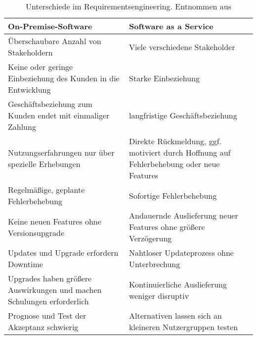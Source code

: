 \begin{table}[ht!]
\centering
\begin{longtable}{|p{}|p{}|}
\hline
\textbf{On-Premise-Software} & \textbf{Software as a Service} \\
\hline %
Überschaubare Anzahl von Stakeholdern & Viele verschiedene Stakeholder \\
\hline
Keine oder geringe Einbeziehung des Kunden in die Entwicklung & Starke 
Einbeziehung \\ \hline
Geschäftsbeziehung zum Kunden endet mit einmaliger Zahlung & langfristige 
Geschäftsbeziehung \\ \hline
Nutzungserfahrungen nur über spezielle Erhebungen & Direkte Rückmeldung, ggf. 
motiviert durch Hoffnung auf Fehlerbehebung oder neue Features \\ \hline
Regelmäßige, geplante Fehlerbehebung & Sofortige Fehlerbehebung \\ \hline
Keine neuen Features ohne Versionsupgrade & Andauernde Auslieferung neuer 
Features ohne größere Verzögerung \\ \hline
Updates und Upgrade erfordern Downtime & Nahtloser Updateprozess ohne 
Unterbrechung \\ \hline
Upgrades haben größere Auswirkungen und machen Schulungen erforderlich & 
Kontinuierliche Auslieferung weniger disruptiv \\ \hline
Prognose und Test der Akzeptanz schwierig & Alternativen lassen sich an 
kleineren Nutzergruppen testen \\
\hline %
\end{longtable}
\caption{Unterschiede im Requirementsengineering. Entnommen aus 
\cite{changes_in_requirements_engineering}}
\label{tab:unterschiede_im_re}
\end{table}